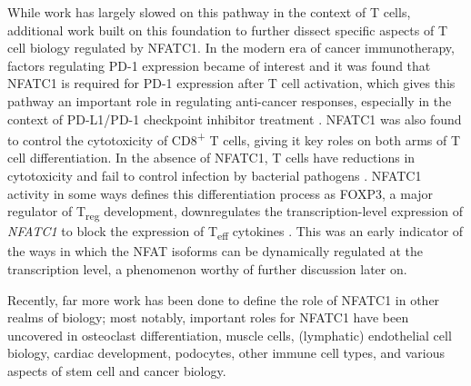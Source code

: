 While work has largely slowed on this pathway in the context of T cells, additional work built on this foundation to further dissect specific aspects of T cell biology regulated by NFATC1. In the modern era of cancer immunotherapy, factors regulating PD\hyp{}1 expression became of interest and it was found that NFATC1 is required for PD\hyp{}1 expression after T cell activation, which gives this pathway an important role in regulating anti\hyp{}cancer responses, especially in the context of PD\hyp{}L1/PD\hyp{}1 checkpoint inhibitor treatment \citep{Oestreich2008}. NFATC1 was also found to control the cytotoxicity of CD8\textsuperscript{+} T cells, giving it key roles on both arms of T cell differentiation. In the absence of NFATC1, T cells have reductions in cytotoxicity and fail to control infection by bacterial pathogens \citep{KleinHessling2017}. NFATC1 activity in some ways defines this differentiation process as FOXP3, a major regulator of T\textsubscript{reg} development, downregulates the transcription\hyp{}level expression of \textit{NFATC1} to block the expression of T\textsubscript{eff} cytokines \citep{Torgerson2009}. This was an early indicator of the ways in which the NFAT isoforms can be dynamically regulated at the transcription level, a phenomenon worthy of further discussion later on.

Recently, far more work has been done to define the role of NFATC1 in other realms of biology; most notably, important roles for NFATC1 have been uncovered in osteoclast differentiation, muscle cells, (lymphatic) endothelial cell biology, cardiac development, podocytes, other immune cell types, and various aspects of stem cell and cancer biology.

